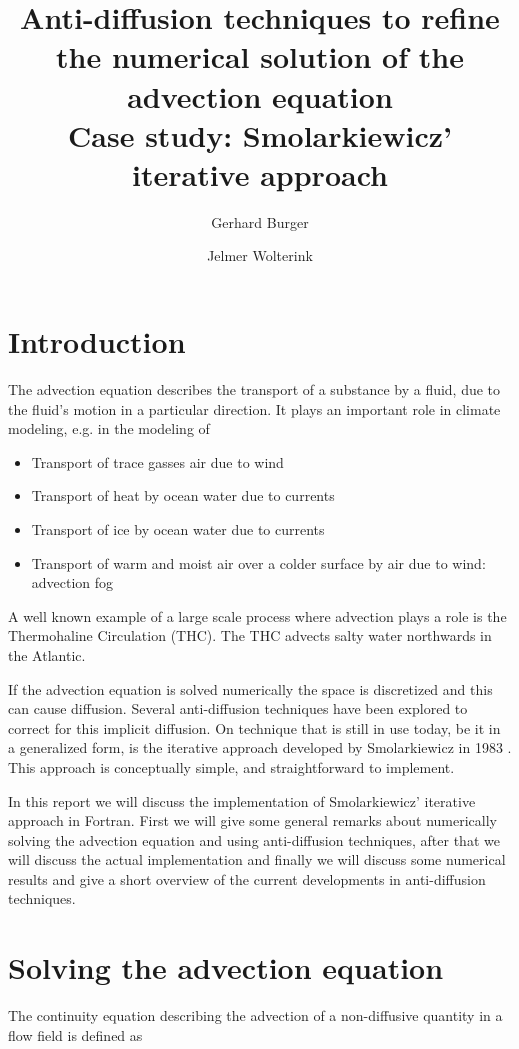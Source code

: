 \documentclass[10pt, a4paper]{article}
\author{Gerhard Burger \and Jelmer Wolterink}
\title{Anti-diffusion techniques to refine the numerical solution of the advection equation\\ Case study: Smolarkiewicz' iterative approach}
\begin{document}
\maketitle

\section{Introduction}
The advection equation describes the transport of a substance by a fluid, due to the fluid's motion in a particular direction. It plays an important role in climate modeling, e.g. in the modeling of
\begin{itemize}
   \item Transport of trace gasses air due to wind
   \item Transport of heat by ocean water due to currents
   \item Transport of ice by ocean water due to currents
   \item Transport of warm and moist air over a colder surface by air due to wind: advection fog
\end{itemize}

A well known example of a large scale process where advection plays a role is the Thermohaline Circulation (THC). The THC advects salty water northwards in the Atlantic.

If the advection equation is solved numerically the space is discretized and this can cause diffusion. Several anti-diffusion techniques have been explored to correct for this implicit diffusion. On technique that is still in use today, be it in a generalized form, is the iterative approach developed by Smolarkiewicz in 1983 \cite{smolarki}. This approach is conceptually simple, and straightforward to implement.

In this report we will discuss the implementation of Smolarkiewicz' iterative approach in Fortran. First we will give some general remarks about numerically solving the advection equation and using anti-diffusion techniques, after that we will discuss the actual implementation and finally we will discuss some numerical results and give a short overview of the current developments in anti-diffusion techniques.

\section{Solving the advection equation}
\label{sec:solvadveq}
The continuity equation describing the advection of a non-diffusive quantity in a flow field is defined as
\end{document}
